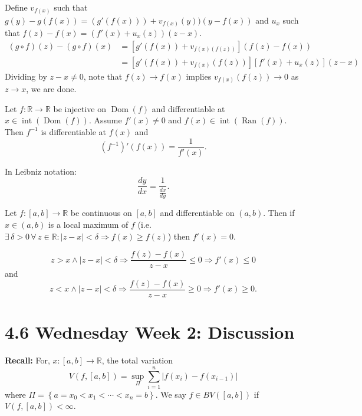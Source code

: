 \documentclass{notes}
\begin{document}
  \newpage
  
  \begin{prf}
    Define $v_{f(x)}$ such that $g(y) - g(f(x)) = (g'(f(x))) + v_{f(x)}(y)) (y  - f(x))$ and $u_x$ such that $f(z) - f(x) = (f'(x) + u_x(z)) (z - x)$.
    \begin{align*}
      (g \circ f)(z) - (g \circ f)(x) &= [g'(f(x)) + v_{f(x)(f(z))}] (f(z) - f(x)) \\ 
      &= [g'(f(x)) + v_{f(x)}(f(z))] [f'(x) + u_x(z)] (z - x)
    \end{align*}
    Dividing by $z - x \neq 0$, note that $f(z) \to f(x)$ implies $v_{f(x)}(f(z)) \to 0$ as $z \to x$, we are done.
  \end{prf}
  
  \begin{lem}
    Let $f \colon \mathbb R \to \mathbb R$ be injective on $\operatorname{Dom}(f)$ and differentiable at $x \in \operatorname{int}(\operatorname{Dom}(f))$.
    Assume $f'(x) \neq 0$ and $f(x) \in \operatorname{int}(\operatorname{Ran}(f))$.
    Then $f^{-1}$ is differentiable at $f(x)$ and 
    \[
      (f^{-1})'(f(x)) = \frac{1}{f'(x)}.
    \]
    
    In Leibniz notation: 
    \[
      \frac{dy}{dx} = \frac{1}{\frac{dx}{dy}}.
    \]
  \end{lem}
  
  \begin{lem}
    Let $f \colon [a, b] \to \mathbb R$ be continuous on $[a, b]$ and differentiable on $(a, b)$.
    Then if $x \in (a, b)$ is a local maximum of $f$ (i.e. $\exists \, \delta > 0 \, \forall \, z \in \mathbb R: \left | z - x \right | < \delta \Rightarrow f(x) \geq f(z)$) then $f'(x) = 0$.
  \end{lem}
  
  \begin{prf}
    \[
      z > x \land \left | z - x \right | < \delta \Rightarrow \frac{f(z) - f(x)}{z - x} \leq 0 \Rightarrow f'(x) \leq 0
    \]
    and 
    \[
      z < x \land \left | z - x \right | < \delta \Rightarrow \frac{f(z) - f(x)}{z - x} \geq 0 \Rightarrow f'(x) \geq 0.
    \]
  \end{prf}
  
  \section{4.6 Wednesday Week 2: Discussion}
  
  {\boldmath \bfseries Recall:} For, $x \colon [a, b] \to \mathbb R$, the total variation
  \[
    V(f, [a, b]) = \sup_{\Pi} \sum_{i = 1}^n \left | f(x_i) -f(x_{i - 1})  \right |
  \]
  where $\Pi = \left \{ a = x_0 < x_1 < \cdots < x_n = b  \right \}$.
  We say $f \in BV([a, b])$ if $V(f, [a, b]) < \infty$.
  
\end{document}
